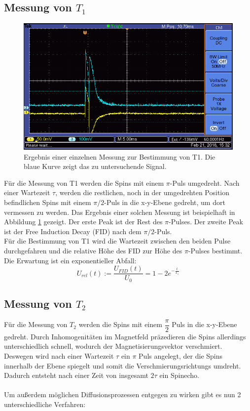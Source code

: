 \documentclass[12pt,a4paper]{article}
\begin{document}
\subsection{Messung von $T_1$}

\begin{figure}
\centering
\includegraphics[scale=0.8]{Bilder/F0003TEK.PNG}
\caption{Ergebnis einer einzelnen Messung zur Bestimmung von T1. Die blaue Kurve zeigt das zu untersuchende Signal.}
\label{fig:MessungT1_Beispiel}
\end{figure}

Für die Messung von T1 werden die Spins mit einem $\pi$-Puls umgedreht. Nach einer Wartezeit $\tau$, werden die restlichen, noch in der umgedrehten Position befindlichen Spins mit einem $\pi /2$-Puls in die x-y-Ebene gedreht, um dort vermessen zu werden. Das Ergebnis einer solchen Messung ist beispielhaft in Abbildung \ref{fig:MessungT1_Beispiel} gezeigt. Der erste Peak ist der Rest des $\pi$-Pulses. Der zweite Peak ist der Free Induction Decay (FID) nach dem $\pi /2$-Puls. \\
Für die Bestimmung von T1 wird die Wartezeit zwischen den beiden Pulse durchgefahren und die relative Höhe des FID zur Höhe des $\pi$-Pulses bestimmt. Die Erwartung ist ein exponentieller Abfall:
\begin{equation}
\label{eq:T1_Exponentialfunktion}
U_{rel} (t) := \dfrac{U_{FID} (t)}{U_0} = 1 - 2 e^{-\frac{t}{T_1}}
\end{equation}


\subsection{Messung von $T_2$}

Für die Messung von $T_2$ werden die Spins mit einem  $\dfrac{\pi}{2}$ Puls in die x-y-Ebene gedreht. Durch Inhomogenitäten im Magnetfeld präzedieren die Spins allerdings unterschiedlich schnell, wodurch der Magnetisierungsvektor verschmiert. Deswegen wird nach einer Wartezeit $\tau$ ein $\pi$ Puls angelegt, der die Spins innerhalb der Ebene spiegelt und somit die Verschmierungsrichtungs umdreht. Dadurch entsteht nach einer Zeit von insgesamt $2 \tau$ ein Spinecho. \\ 
\\
Um außerdem möglichen Diffusionsprozessen entgegen zu wirken gibt es nun 2 unterschiedliche Verfahren:
\end{document}
